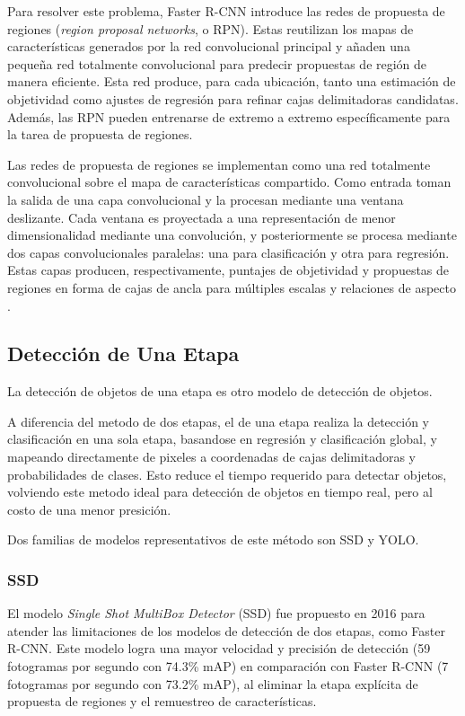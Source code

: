 Para resolver este problema, Faster R-CNN introduce las redes de propuesta de regiones 
(\textit{region proposal networks}, o RPN). Estas reutilizan los mapas de características generados por 
la red convolucional principal y añaden una pequeña red totalmente convolucional para predecir propuestas 
de región de manera eficiente. Esta red produce, para cada ubicación, tanto una estimación de objetividad 
como ajustes de regresión para refinar cajas delimitadoras candidatas. Además, 
las RPN pueden entrenarse de extremo a extremo específicamente para la tarea de propuesta de regiones.
\medskip

Las redes de propuesta de regiones se implementan como una red totalmente convolucional sobre el mapa de 
características compartido. Como entrada toman la salida de una capa convolucional y la procesan 
mediante una ventana deslizante. Cada ventana es proyectada a una representación de menor 
dimensionalidad mediante una convolución, y posteriormente se procesa mediante dos capas 
convolucionales paralelas: una para clasificación y otra para regresión. 
Estas capas producen, respectivamente, puntajes de objetividad y propuestas de 
regiones en forma de cajas de ancla para múltiples escalas y relaciones de aspecto \parencite{ren2016faster}.


\subsection{Detección de Una Etapa}
La detección de objetos de una etapa es otro modelo de detección de objetos.
\medskip

A diferencia del metodo de dos etapas, el de una etapa realiza la detección y clasificación en una sola etapa,
basandose en regresión y clasificación global, y mapeando directamente de pixeles a coordenadas de cajas
delimitadoras y probabilidades de clases. Esto reduce el tiempo requerido para detectar objetos, volviendo
este metodo ideal para detección de objetos en tiempo real, pero al costo de una menor presición.
\medskip

Dos familias de modelos representativos de este método son SSD y YOLO.

\subsubsection{SSD}
El modelo \textit{Single Shot MultiBox Detector} (SSD) fue propuesto en 2016 para atender las limitaciones 
de los modelos de detección de dos etapas, como Faster R-CNN. Este modelo logra una mayor velocidad y 
precisión de detección (59 fotogramas por segundo con 74.3\% mAP) en comparación con Faster R-CNN 
(7 fotogramas por segundo con 73.2\% mAP), al eliminar la etapa explícita de propuesta de regiones y el 
remuestreo de características.
\medskip


